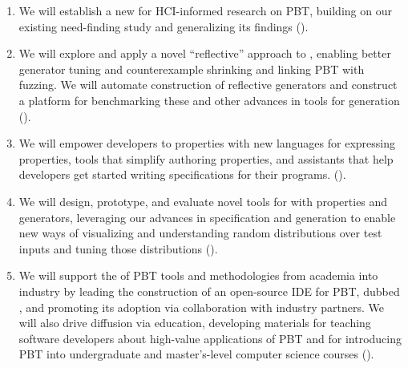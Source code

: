 \begin{enumerate}[noitemsep]
\item We will establish a new  for HCI-informed
research on PBT, building on our existing need-finding study and
generalizing its findings ().
%
\item We will explore and apply a novel ``reflective'' approach to
, enabling better generator tuning and counterexample
shrinking and linking PBT with fuzzing.  We will automate construction
of reflective generators and construct a platform for
benchmarking these and other advances in tools for generation ().

%
\item We will empower developers to  properties with new
languages for expressing properties, tools that simplify authoring
properties, and assistants that help developers get started writing
specifications for their programs.
().
%
\item We will design, prototype, and evaluate novel tools for
 with properties
and generators, leveraging our advances in specification and generation to
enable new ways of visualizing and understanding random distributions
    over test inputs and tuning those distributions
().
%
\item We will support the  of PBT tools and
methodologies from academia into industry by
leading the construction of
    an open-source IDE for PBT,
    dubbed \tyche, and promoting its adoption via
    collaboration with industry partners.
We will also drive diffusion via education, developing materials for teaching
software developers about high-value applications of PBT and
for introducing PBT into undergraduate and master's-level computer science courses
().
\end{enumerate}

